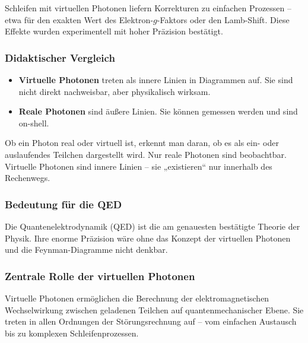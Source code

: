 \begin{tcolorbox}[hinweisbox, title=Schleifendiagramme und Präzisionseffekte]
	\label{box:Schleifendiagramme}
	Schleifen mit virtuellen Photonen liefern Korrekturen zu einfachen Prozessen – etwa für den exakten Wert des Elektron-$g$-Faktors oder den Lamb-Shift. Diese Effekte wurden experimentell mit hoher Präzision bestätigt.
\end{tcolorbox}

\subsubsection*{Didaktischer Vergleich}
\begin{itemize}
	\item \textbf{Virtuelle Photonen} treten als innere Linien in Diagrammen auf. Sie sind nicht direkt nachweisbar, aber physikalisch wirksam.
	\item \textbf{Reale Photonen} sind äußere Linien. Sie können gemessen werden und sind on-shell.
\end{itemize}

\begin{tcolorbox}[didaktikbox, title=Reale oder virtuelle Photonen im Diagramm]
	\label{box:Reale oder virtuelle Photonen}
	Ob ein Photon real oder virtuell ist, erkennt man daran, ob es als ein- oder auslaufendes Teilchen dargestellt wird. Nur reale Photonen sind beobachtbar. Virtuelle Photonen sind innere Linien – sie „existieren“ nur innerhalb des Rechenwegs.
\end{tcolorbox}

\subsubsection{Bedeutung für die QED}

Die Quantenelektrodynamik (QED) ist die am genauesten bestätigte Theorie der Physik. Ihre enorme Präzision wäre ohne das Konzept der virtuellen Photonen und die Feynman-Diagramme nicht denkbar.

\subsubsection*{Zentrale Rolle der virtuellen Photonen}
Virtuelle Photonen ermöglichen die Berechnung der elektromagnetischen Wechselwirkung zwischen geladenen Teilchen auf quantenmechanischer Ebene. Sie treten in allen Ordnungen der Störungsrechnung auf – vom einfachen Austausch bis zu komplexen Schleifenprozessen.

